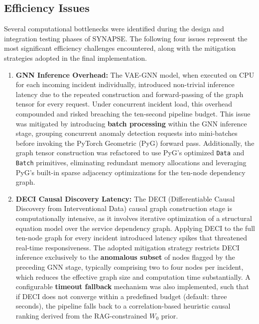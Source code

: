 \subsection{Efficiency Issues}

\hspace*{0.3in} Several computational bottlenecks were identified during the design and integration testing phases of SYNAPSE. The following four issues represent the most significant efficiency challenges encountered, along with the mitigation strategies adopted in the final implementation.

\begin{enumerate}[label=\textbf{\Alph*.},leftmargin=1.2cm]

    \item \textbf{GNN Inference Overhead:} The VAE-GNN model, when executed on CPU for each incoming incident individually, introduced non-trivial inference latency due to the repeated construction and forward-passing of the graph tensor for every request. Under concurrent incident load, this overhead compounded and risked breaching the ten-second pipeline budget. This issue was mitigated by introducing \textbf{batch processing} within the GNN inference stage, grouping concurrent anomaly detection requests into mini-batches before invoking the PyTorch Geometric (PyG) forward pass. Additionally, the graph tensor construction was refactored to use PyG's optimized \texttt{Data} and \texttt{Batch} primitives, eliminating redundant memory allocations and leveraging PyG's built-in sparse adjacency optimizations for the ten-node dependency graph.

    \item \textbf{DECI Causal Discovery Latency:} The DECI (Differentiable Causal Discovery from Interventional Data) causal graph construction stage is computationally intensive, as it involves iterative optimization of a structural equation model over the service dependency graph. Applying DECI to the full ten-node graph for every incident introduced latency spikes that threatened real-time responsiveness. The adopted mitigation strategy restricts DECI inference exclusively to the \textbf{anomalous subset} of nodes flagged by the preceding GNN stage, typically comprising two to four nodes per incident, which reduces the effective graph size and computation time substantially. A configurable \textbf{timeout fallback} mechanism was also implemented, such that if DECI does not converge within a predefined budget (default: three seconds), the pipeline falls back to a correlation-based heuristic causal ranking derived from the RAG-constrained $W_0$ prior.


\end{enumerate}
